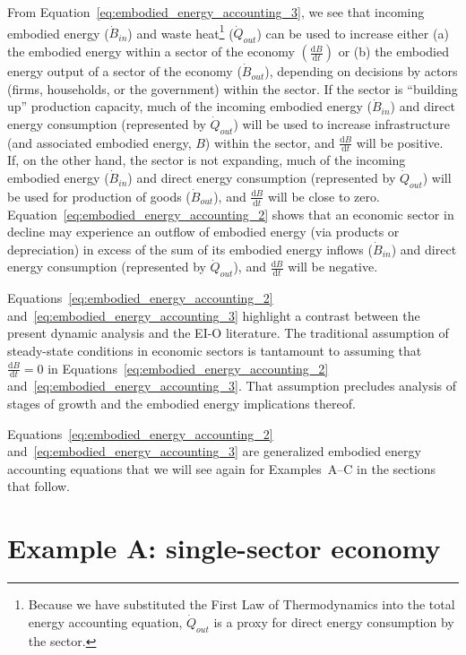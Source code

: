 \noindent From Equation~\ref{eq:embodied_energy_accounting_3},
we see that incoming embodied energy ($\dot{B}_{in}$) and 
waste heat\footnote{Because we have substituted 
	the First Law of Thermodynamics
	into the total energy accounting equation,
	$\dot{Q}_{out}$ is a proxy for direct energy consumption by the sector.} 
($\dot{Q}_{out}$) can be used to increase either (a)
the embodied energy within a sector of the economy 
$\left( \frac{\mathrm{d}B}{\mathrm{d}t}  \right)$
or (b) the embodied energy output of a sector of the economy 
($\dot{B}_{out}$), 
depending on decisions by actors 
(firms, households, or the government) 
within the sector. 
If the sector is ``building up'' production capacity, 
much of the incoming embodied energy ($\dot{B}_{in}$)
and direct energy consumption (represented by $\dot{Q}_{out}$)
will be used to increase infrastructure 
(and associated embodied energy, $B$) within the sector, 
and $\frac{\mathrm{d}B}{\mathrm{d}t}$ will be positive.
If, on the other hand, the sector is not expanding, 
much of the incoming embodied energy ($\dot{B}_{in}$)
and direct energy consumption (represented by $\dot{Q}_{out}$)
will be used for production of goods ($\dot{B}_{out}$),
and $\frac{\mathrm{d}B}{\mathrm{d}t}$ will be close to zero.
Equation~\ref{eq:embodied_energy_accounting_2} shows that
an economic sector in decline may experience an outflow 
of embodied energy (via products or depreciation)
in excess of the sum of 
its embodied energy inflows ($\dot{B}_{in}$)
and direct energy consumption (represented by $\dot{Q}_{out}$),
and $\frac{\mathrm{d}B}{\mathrm{d}t}$ will be negative.

Equations~\ref{eq:embodied_energy_accounting_2}
and~\ref{eq:embodied_energy_accounting_3} 
highlight a contrast between 
the present dynamic analysis and the EI-O literature.
The traditional assumption of steady-state conditions 
in economic sectors is tantamount to assuming that
$\frac{\mathrm{d}B}{\mathrm{d}t} = 0$ in 
Equations~\ref{eq:embodied_energy_accounting_2}
and~\ref{eq:embodied_energy_accounting_3}.
That assumption precludes analysis of stages of growth 
and the embodied energy implications thereof.

Equations~\ref{eq:embodied_energy_accounting_2}
and~\ref{eq:embodied_energy_accounting_3} 
are generalized embodied energy accounting equations that we will
see again for Examples~A--C in the sections that follow. %


\section{Example A: single-sector economy} %
\label{sec:Embodied_Energy_Example_A}

